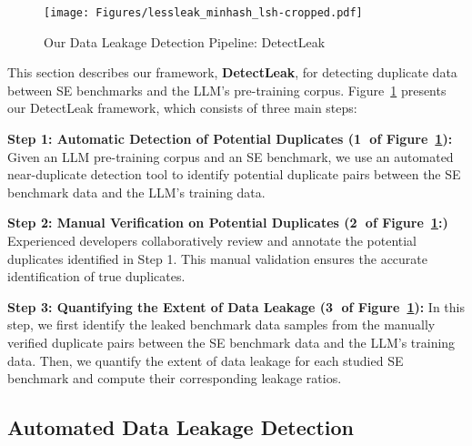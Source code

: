 

\begin{figure}[t] 
    \centering
    \texttt{[image: Figures/lessleak\_minhash\_lsh-cropped.pdf]} 
     \vspace{-0.3cm}
    \caption{Our Data Leakage Detection Pipeline: DetectLeak} 
     \vspace{-0.6cm}
    \label{fig:method_minhash}
\end{figure}



This section describes our framework, \textbf{DetectLeak}, for detecting duplicate data between SE benchmarks and the LLM’s pre-training corpus.
Figure~\ref{fig:method_minhash} presents our DetectLeak framework, which consists of three main steps:

\vspace{0.1cm}
\noindent
\textbf{Step 1: Automatic Detection of Potential Duplicates (\textcircled{1} of Figure~\ref{fig:method_minhash}):} Given an LLM pre-training corpus and an SE benchmark, we use an automated near-duplicate detection tool to identify potential duplicate pairs between the SE benchmark data and the LLM's training data.


\vspace{0.1cm}
\noindent
\textbf{Step 2: Manual Verification on Potential Duplicates (\textcircled{2} of Figure~\ref{fig:method_minhash}:)} Experienced developers collaboratively review and annotate the potential duplicates identified in Step 1. This manual validation ensures the accurate identification of true duplicates.


\vspace{0.1cm}
\noindent
\textbf{Step 3: Quantifying the Extent of Data Leakage (\textcircled{3} of Figure~\ref{fig:method_minhash}):}  In this step, we first identify the leaked benchmark data samples from the manually verified duplicate pairs between the SE benchmark data and the LLM's training data. Then, we quantify the extent of data leakage for each studied SE benchmark and compute their corresponding leakage ratios.




\subsection{Automated Data Leakage Detection}



